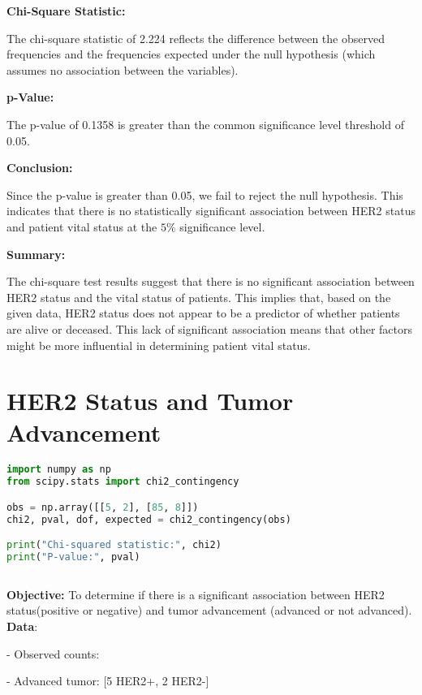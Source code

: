 \documentclass[12 px]{article}
\begin{document}
\textbf{Chi-Square Statistic:}

The chi-square statistic of 2.224 reflects the difference between the observed frequencies and the frequencies expected under the null hypothesis (which assumes no association between the variables).

\textbf{p-Value:}
 
The p-value of 0.1358 is greater than the common significance level threshold of 0.05.

\textbf{Conclusion:}

Since the p-value is greater than 0.05, we fail to reject the null hypothesis. This indicates that there is no statistically significant association between HER2 status and patient vital status at the $5\%$ significance level.
            
\textbf{Summary:}

The chi-square test results suggest that there is no significant association 
between HER2 status and the vital status of patients. This implies that, based 
on the given data, HER2 status does not appear to be a predictor of whether 
patients are alive or deceased. This lack of significant association means 
that other factors might be more influential in determining patient vital status.





\section*{HER2 Status and Tumor Advancement}
\begin{lstlisting}[language=Python, breaklines=true]
import numpy as np
from scipy.stats import chi2_contingency

obs = np.array([[5, 2], [85, 8]])
chi2, pval, dof, expected = chi2_contingency(obs)

print("Chi-squared statistic:", chi2)
print("P-value:", pval)
        
\end{lstlisting}

\textbf{Objective:} To determine if there is a significant association between HER2 status(positive or negative) and tumor advancement (advanced or not advanced).\\[5px]

\textbf{Data}:

- Observed counts:

  - Advanced tumor: [5 HER2+, 2 HER2-]
  
\end{document}
